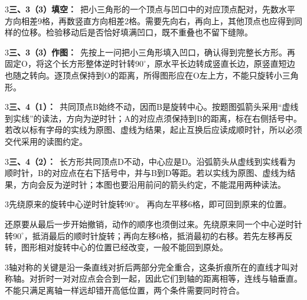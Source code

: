 \documentclass[multi=snippet,border={5bp 20bp 5bp 5bp}]{standalone}
\newenvironment{snippet}[3]{\begin{minipage}{#1bp}\color{answerred}\fontsize{#2}{#3}\selectfont\raggedright}{\end{minipage}}
\begin{document}
\begin{snippet}{505}{11.5}{14}\begin{multicols}{3}\raggedcolumns \textbf{三、3（3）填空：}\ 把小三角形的一个顶点与凹口中的对应顶点配对，先数水平方向相差9格，再数竖直方向相差2格。需要先向右，再向上，其他顶点也应得到同样的位移。检验移动后是否恰好填满凹口，既不重叠也不留下缝隙。\end{multicols}\end{snippet}
\begin{snippet}{505}{11.5}{14}\begin{multicols}{3}\raggedcolumns \textbf{三、3（3）作图：}\ 先按上一问把小三角形填入凹口，确认得到完整长方形。再固定O，将这个长方形整体逆时针转\(90^\circ\)\allowbreak ，原水平长边转成竖直长边，原竖直短边也随之转向。逐顶点保持到O的距离，所得图形应在O左上方，不能只旋转小三角形。\end{multicols}\end{snippet}
\begin{snippet}{505}{11.5}{14}\begin{multicols}{3}\raggedcolumns \textbf{三、4（1）：}\ 共同顶点B始终不动，因而B是旋转中心。按题图弧箭头采用“虚线到实线”的读法，方向为逆时针；A的对应点须保持到B的距离，标在右侧括号中。若改以标有字母的实线为原图、虚线为结果，起止互换后应读成顺时针，所以必须交代采用的读图约定。\end{multicols}\end{snippet}
\begin{snippet}{505}{11.5}{14}\begin{multicols}{3}\raggedcolumns \textbf{三、4（2）：}\ 长方形共同顶点D不动，中心应是D。沿弧箭头从虚线到实线看为顺时针，B的对应点在右下括号中，并与B到D等距。若以实线为原图、虚线为结果，方向会反为逆时针；本图也要沿用前问的箭头约定，不能混用两种读法。\end{multicols}\end{snippet}
\begin{snippet}{505}{11.5}{14}\begin{multicols}{3}\raggedcolumns 先绕原来的旋转中心逆时针旋转90\ensuremath{^\circ}。 再向左平移6格，即可回到原来的位置。\par 还原要从最后一步开始撤销，动作的顺序也须倒过来。先绕原来同一个中心逆时针转\(90^\circ\)\allowbreak ，抵消最后的顺时针旋转；再向左移6格，抵消最初的右移。若先左移再反转，图形相对旋转中心的位置已经改变，一般不能回到原处。\end{multicols}\end{snippet}
\begin{snippet}{505}{11.5}{14}\begin{multicols}{3}\raggedcolumns 轴对称的关键是沿一条直线对折后两部分完全重合，这条折痕所在的直线才叫对称轴。对折时一对对应点会合到一起，因此它们到轴的距离相等，连线与轴垂直。不能只满足离轴一样远却错开高低位置，两个条件需要同时符合。\end{multicols}\end{snippet}
\end{document}
